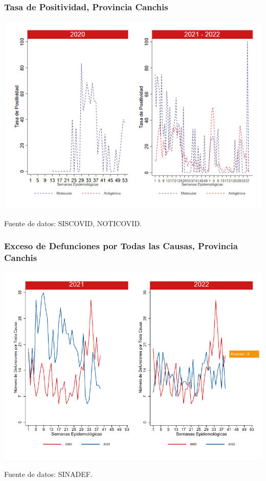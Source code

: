 \documentclass[xcolor=table]{beamer}
\begin{document}
\begin{frame}
	\frametitle{Tasa de Positividad, Provincia Canchis}
	\vspace{-.5cm}
	\begin{center}
		\includegraphics[width=0.8\linewidth, trim={0cm .5cm 0cm 0.2cm},clip]{../figuras/positividad_20_21_5.png}
	\end{center}
	{\tiny Fuente de datos: SISCOVID, NOTICOVID.}
\end{frame}

\begin{frame}
	\frametitle{Exceso de Defunciones por Todas las Causas, Provincia Canchis}
	\vspace{-.5cm}
	\begin{center}
		\includegraphics[width=0.8\linewidth, trim={0cm .5cm 0cm 0.2cm},clip]{../figuras/exceso_5.pdf}
	\end{center}
	{\tiny Fuente de datos: SINADEF.}
	
	\hyperlink{indicadores_provinciales}{}
\end{frame}
\end{document}
